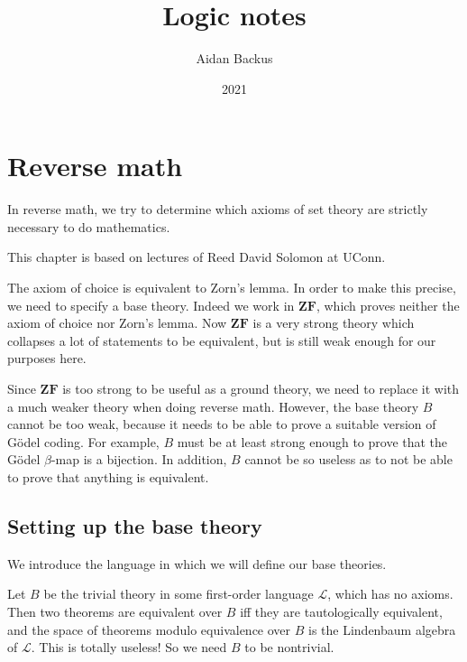 \documentclass[12pt]{book}
\title{Logic notes}
\author{Aidan Backus}
\date{2021}
\theoremstyle{definition}
\newenvironment{example}
  {\pushQED{\qed}\renewcommand{\qedsymbol}{$\diamondsuit$}\examplex}
  {\popQED\endexamplex}
\begin{document}
\maketitle

\tableofcontents

\chapter{Reverse math}
In reverse math, we try to determine which axioms of set theory are strictly necessary to do mathematics.

This chapter is based on lectures of Reed David Solomon at UConn.

\begin{example}
The axiom of choice is equivalent to Zorn's lemma. In order to make this precise, we need to specify a base theory.
Indeed we work in $\mathbf{ZF}$, which proves neither the axiom of choice nor Zorn's lemma. Now $\mathbf{ZF}$ is a very strong theory which collapses a lot of statements to be equivalent, but is still weak enough for our purposes here.
\end{example}

Since $\mathbf{ZF}$ is too strong to be useful as a ground theory, we need to replace it with a much weaker theory when doing reverse math.
However, the base theory $B$ cannot be too weak, because it needs to be able to prove a suitable version of G\"odel coding.
For example, $B$ must be at least strong enough to prove that the G\"odel $\beta$-map is a bijection.
In addition, $B$ cannot be so useless as to not be able to prove that anything is equivalent.

\section{Setting up the base theory}
We introduce the language in which we will define our base theories.

\begin{example}
Let $B$ be the trivial theory in some first-order language $\mathcal L$, which has no axioms. Then two theorems are equivalent over $B$ iff they are tautologically equivalent, and the space of theorems modulo equivalence over $B$ is the Lindenbaum algebra of $\mathcal L$. This is totally useless! So we need $B$ to be nontrivial.
\end{example}
\end{document}
